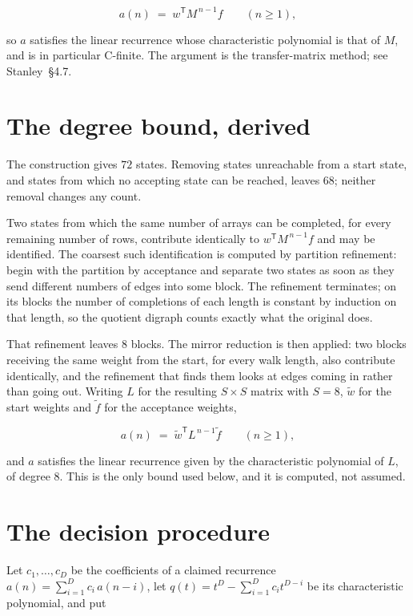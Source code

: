 \documentclass[11pt]{article}
\theoremstyle{definition}
\begin{document}
\[a(n) \;=\; w^{\mathsf T} M^{\,n-1} f \qquad (n \ge 1),\]

so $a$ satisfies the linear recurrence whose characteristic polynomial is that of $M$, and is in particular C-finite. The argument is the transfer-matrix method; see Stanley~\S4.7.

\section{The degree bound, derived}

The construction gives $72$ states. Removing states unreachable from a start state, and states from which no accepting state can be reached, leaves $68$; neither removal changes any count.

Two states from which the same number of arrays can be completed, for every remaining number of rows, contribute identically to $w^{\mathsf T}M^{\,n-1}f$ and may be identified. The coarsest such identification is computed by partition refinement: begin with the partition by acceptance and separate two states as soon as they send different numbers of edges into some block. The refinement terminates; on its blocks the number of completions of each length is constant by induction on that length, so the quotient digraph counts exactly what the original does.

That refinement leaves $8$ blocks. The mirror reduction is then applied: two blocks receiving the same weight from the start, for every walk length, also contribute identically, and the refinement that finds them looks at edges coming in rather than going out. Writing $L$ for the resulting $S \times S$ matrix with $S = 8$, $\tilde w$ for the start weights and $\tilde f$ for the acceptance weights,

\[a(n) \;=\; \tilde w^{\mathsf T} L^{\,n-1} \tilde f \qquad (n \ge 1),\]

and $a$ satisfies the linear recurrence given by the characteristic polynomial of $L$, of degree $8$. This is the only bound used below, and it is computed, not assumed.

\section{The decision procedure}

Let $c_1,\dots,c_D$ be the coefficients of a claimed recurrence $a(n) = \sum_{i=1}^{D} c_i\,a(n-i)$, let $q(t) = t^{D} - \sum_{i=1}^{D} c_i t^{D-i}$ be its characteristic polynomial, and put
\end{document}
